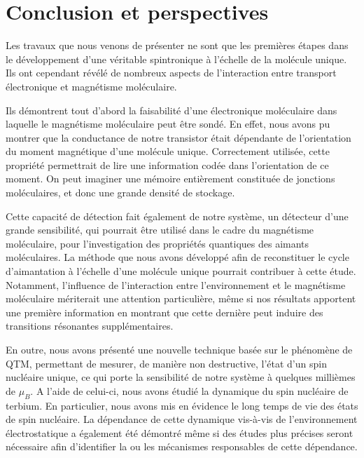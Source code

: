 \chapter*{Conclusion et perspectives}
\setcounter{figure}{0}

Les travaux que nous venons de présenter ne sont que les premières étapes dans le développement d'une véritable spintronique à l'échelle de la molécule unique. Ils ont cependant révélé de nombreux aspects de l'interaction entre transport électronique et magnétisme moléculaire.

Ils démontrent tout d'abord la faisabilité d'une électronique moléculaire dans laquelle le magnétisme moléculaire peut être sondé. En effet, nous avons pu montrer que la conductance de notre transistor était dépendante de l'orientation du moment magnétique d'une molécule unique. Correctement utilisée, cette propriété permettrait de lire une information codée dans l'orientation de ce moment. On peut imaginer une mémoire entièrement constituée de jonctions moléculaires, et donc une grande densité de stockage.

Cette capacité de détection fait également de notre système, un détecteur d'une grande sensibilité, qui pourrait être utilisé dans le cadre du magnétisme moléculaire, pour l'investigation des propriétés quantiques des aimants moléculaires. La méthode que nous avons développé afin de reconstituer le cycle d'aimantation à l'échelle d'une molécule unique pourrait contribuer à cette étude. Notamment, l'influence de l'interaction entre l'environnement et le magnétisme moléculaire mériterait une attention particulière, même si nos résultats apportent une première information en montrant que cette dernière peut induire des transitions résonantes supplémentaires.

En outre, nous avons présenté une nouvelle technique basée sur le phénomène de QTM, permettant de mesurer, de manière non destructive, l'état d'un spin nucléaire unique, ce qui porte la sensibilité de notre système à quelques millièmes de $\mu_B$. A l'aide de celui-ci, nous avons étudié la dynamique du spin nucléaire de terbium. En particulier, nous avons mis en évidence le long temps de vie des états de spin nucléaire. La dépendance de cette dynamique vis-à-vis de l'environnement électrostatique a également été démontré même si des études plus précises seront nécessaire afin d'identifier la ou les mécanismes responsables de cette dépendance.

